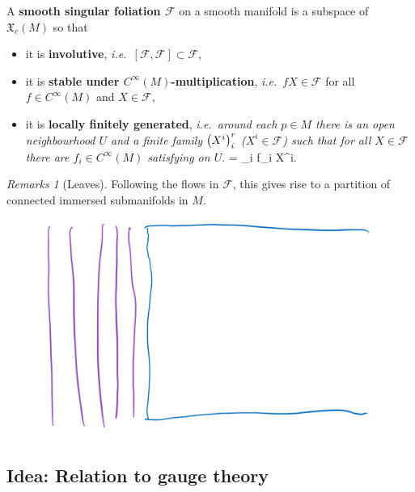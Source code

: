 \documentclass[hyperref={pdfpagelabels=false}]{beamer}
\def\bas#1\eas{\begin{align*}#1\end{align*}}
\theoremstyle{plain}
\theoremstyle{remark}
\newtheorem*{remark}{Remarks}
\begin{document}
\begin{frame}
\begin{definition}
A \textbf{smooth singular foliation $\mathcal{F}$} on a smooth manifold is a subspace of $\mathfrak{X}_c(M)$ so that
\begin{itemize}
	\item it is \textbf{involutive}, \textit{i.e.\ $[\mathcal{F}, \mathcal{F}] \subset \mathcal{F}$},
	\item it is \textbf{stable under $C^\infty(M)$-multiplication}, \textit{i.e.}\ $fX \in \mathcal{F}$ for all $f \in C^\infty(M)$ and $X \in \mathcal{F}$,
	\item it is \textbf{locally finitely generated}, \textit{i.e.\ around each $p \in M$ there is an open neighbourhood $U$ and a finite family $\mleft( X^i \mright)_i^{r}$ ($X^i \in \mathcal{F}$) such that for all $X \in \mathcal{F}$ there are $f_i \in C^\infty(M)$ satisfying on $U$}.
	\bas
	X = \sum_i f_i X^i.
	\eas
\end{itemize}
\end{definition}
\end{frame}

\begin{frame}
\begin{remark}[Leaves]
Following the flows in $\mathcal{F}$, this gives rise to a partition of connected immersed submanifolds in $M$.
\end{remark}

\begin{figure}[htbp]
	\centering
		\includegraphics[width=.70\textwidth]{Foliation example.png}
	\label{fig:Foliation example}
\end{figure}


\end{frame}


\subsection{Idea: Relation to gauge theory}
\end{document}
